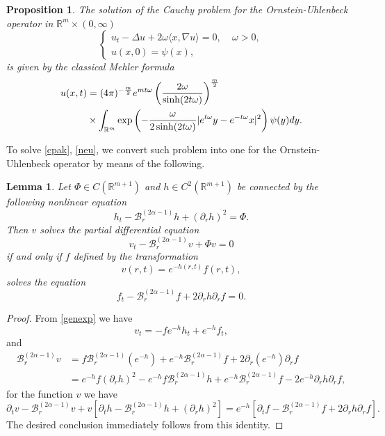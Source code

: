 \documentclass[11pt,a4paper]{amsart}
\def \R {\mathbb{R}}
\newcommand{\Barr}{\mathscr B_r^{(2\alpha-1)}}
\newcommand{\Rm}{\mathbb R^m}
\newcommand{\p}{\partial}
\numberwithin{equation}{section}
\newtheorem{lemma}[theorem]{Lemma}
\newtheorem{proposition}[theorem]{Proposition}
\numberwithin{equation}{section}
\begin{document}
\begin{proposition}\label{P:ou} The solution of the Cauchy problem for the Ornstein-Uhlenbeck operator in $\Rm\times (0,\infty)$ 
\begin{equation}\label{cpou}
\begin{cases}
u_t - \Delta u + 2 \omega \langle x,\nabla u\rangle  = 0,\ \ \ \ \ \omega>0,
\\
u(x,0) = \psi(x),
\end{cases}
\end{equation}
is given by the classical Mehler formula
\begin{align}\label{gustavo}
u(x,t) & = (4\pi)^{- \frac m2} e^{m t \omega} \left(\frac{2\omega}{\sinh(2t \omega)}\right)^{\frac m2}
\\
& \times \int_{\Rm} \exp\left( -  \frac{\omega}{2 \sinh(2t \omega)} |e^{t \omega} y - e^{-t \omega} x|^2\right) \psi(y) dy.
\notag
\end{align}
\end{proposition}



To solve \eqref{cpak}, \eqref{neu}, we convert such problem into one for the Ornstein-Uhlenbeck operator by means of the following.

\begin{lemma}\label{L:ouho}
Let $\Phi\in C(\R^{m+1})$ and $h\in C^2(\R^{m+1})$ be connected by the following  nonlinear equation
\begin{equation}\label{riccati}
h_t - \Barr h + (\p_r h)^2  = \Phi.
\end{equation}
Then $v$ solves the partial differential equation
\begin{equation}\label{pdeho}
v_t -\Barr v + \Phi v  = 0
\end{equation}
if and only if $f$ defined by the transformation
\begin{equation}\label{genexp}
v(r,t) = e^{-h(r,t)} f(r,t),
\end{equation} 
solves the equation
\begin{equation}\label{PDEou}
f_t - \Barr f + 2 \p_r h \p_r  f  = 0.
\end{equation}
\end{lemma}

\begin{proof}
From \eqref{genexp} we have
\[
v_t = - f e^{-h} h_t + e^{-h} f_t,
\]
and
\begin{align*}
\Barr v & = f \Barr(e^{-h}) + e^{-h} \Barr f + 2 \p_r (e^{-h}) \p_r f
\\
& = e^{-h} f (\p_r h)^2 - e^{-h} f \Barr h + e^{-h} \Barr f  - 2 e^{-h} \p_r h \p_r f,
\end{align*}
for the function $v$ we have
\[
\p_t v - \Barr v + v[\p_t h - \Barr h + (\p_r h)^2] = e^{-h}[\p_t f - \Barr f + 2 \p_r h \p_r f].
\]
The desired conclusion immediately follows from this identity.

\end{proof}
\end{document}
